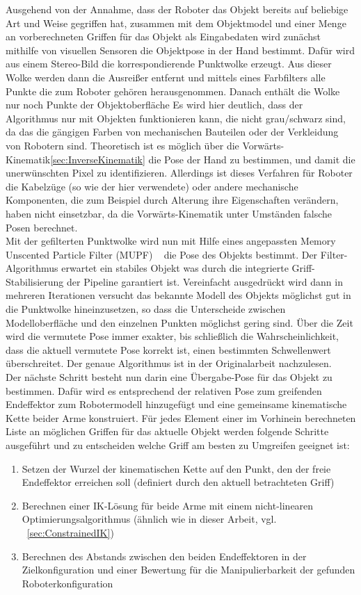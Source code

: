 Ausgehend von der Annahme, dass der Roboter das Objekt bereits auf beliebige Art und Weise gegriffen hat, zusammen mit dem Objektmodel und einer Menge an vorberechneten Griffen für das Objekt als Eingabedaten wird zunächst mithilfe von visuellen Sensoren die Objektpose in der Hand bestimmt. Dafür wird aus einem Stereo-Bild die korrespondierende Punktwolke erzeugt. Aus dieser Wolke werden dann die Ausreißer entfernt und mittels eines Farbfilters alle Punkte die zum Roboter gehören herausgenommen. Danach enthält die Wolke nur noch Punkte der Objektoberfläche Es wird hier deutlich, dass der Algorithmus nur mit Objekten funktionieren kann, die nicht grau/schwarz sind, da das die gängigen Farben von mechanischen Bauteilen oder der Verkleidung von Robotern sind. Theoretisch ist es möglich über die Vorwärts-Kinematik\ref{sec:InverseKinematik} die Pose der Hand zu bestimmen, und damit die unerwünschten Pixel zu identifizieren. Allerdings ist dieses Verfahren für Roboter die Kabelzüge (so wie der hier verwendete) oder andere mechanische Komponenten, die zum Beispiel durch Alterung ihre Eigenschaften verändern, haben nicht einsetzbar, da die Vorwärts-Kinematik unter Umständen falsche Posen berechnet. \\
Mit der gefilterten Punktwolke wird nun mit Hilfe eines angepassten \glqq Memory Unscented Particle Filter\grqq{} (MUPF) ~\citep{vezzani2017memory} die Pose des Objekts bestimmt. Der Filter-Algorithmus erwartet ein stabiles Objekt was durch die integrierte Griff-Stabilisierung der Pipeline garantiert ist. Vereinfacht ausgedrückt wird dann in mehreren Iterationen versucht das bekannte Modell des Objekts möglichst gut in die Punktwolke hineinzusetzen, so dass die Unterscheide zwischen Modelloberfläche und den einzelnen Punkten möglichst gering sind. Über die Zeit wird die vermutete Pose immer exakter, bis schließlich die Wahrscheinlichkeit, dass die aktuell vermutete Pose korrekt ist, einen bestimmten Schwellenwert überschreitet. Der genaue Algorithmus ist in der Originalarbeit nachzulesen.
\\

Der nächste Schritt besteht nun darin eine Übergabe-Pose für das Objekt zu bestimmen. Dafür wird es entsprechend der relativen Pose zum greifenden Endeffektor zum Robotermodell hinzugefügt und eine gemeinsame kinematische Kette beider Arme konstruiert. Für jedes Element einer im Vorhinein berechneten Liste an möglichen Griffen für das aktuelle Objekt werden folgende Schritte ausgeführt und zu entscheiden welche Griff am besten zu Umgreifen geeignet ist:
\begin{enumerate}
\item Setzen der Wurzel der kinematischen Kette auf den Punkt, den der freie Endeffektor erreichen soll (definiert durch den aktuell betrachteten Griff)
\item Berechnen einer IK-Lösung für beide Arme mit einem nicht-linearen Optimierungsalgorithmus (ähnlich wie in dieser Arbeit, vgl. ~\ref{sec:ConstrainedIK})
\item Berechnen des Abstands zwischen den beiden Endeffektoren in der Zielkonfiguration und einer Bewertung für die Manipulierbarkeit der gefunden Roboterkonfiguration
\end{enumerate}


